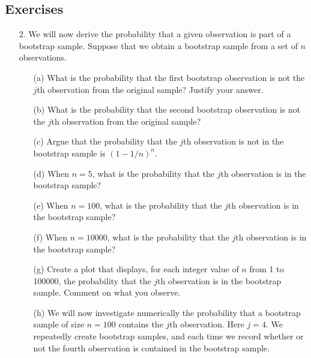 \documentclass[12pt,a4paper]{article}%
\theoremstyle{definition}
\theoremstyle{plain}
\numberwithin{equation}{section}
\begin{document}
\subsection{Exercises}
\begin{enumerate}
\item[2.] We will now derive the probability that a given observation is part of a bootstrap sample. Suppose that we obtain a bootstrap sample from a set of $n$ observations.
\begin{enumerate}
	\item[(a)] What is the probability that the first bootstrap observation is not the $j$th observation from the original sample? Justify your answer.
	\item[(b)] What is the probability that the second bootstrap observation is not the $j$th observation from the original sample?
	\item[(c)] Argue that the probability that the $j$th observation is not in the bootstrap sample is $(1-1/n)^{n}$.
	\item[(d)] When $n = 5$, what is the probability that the $j$th observation is in the bootstrap sample?
	\item[(e)] When $n = 100$, what is the probability that the $j$th observation is in the bootstrap sample?
	\item[(f)] When $n = 10000$, what is the probability that the $j$th observation is in the bootstrap sample?
	\item[(g)] Create a plot that displays, for each integer value of $n$ from 1 to 100000, the probability that the $j$th observation is in the bootstrap sample. Comment on what you observe.
	\item[(h)] We will now investigate numerically the probability that a bootstrap sample of size $n = 100$ contains the $j$th observation. Here $j = 4$. We repeatedly create bootstrap samples, and each time we record whether or not the fourth observation is contained in the bootstrap sample.
\end{enumerate}
\end{enumerate}
\end{document}
